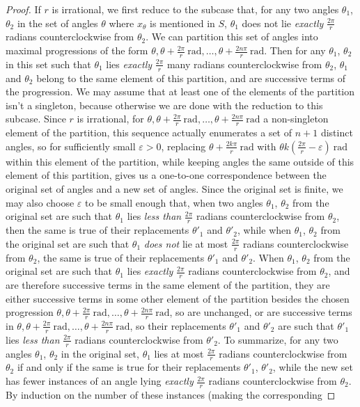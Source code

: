 \documentclass{amsart}
\theoremstyle{definition}
\theoremstyle{remark}
\numberwithin{equation}{section}
\begin{document}
\begin{proof}
    If $r$ is irrational, we first reduce to the subcase that, for any two angles $\theta_{1}$, $\theta_{2}$ in the set of angles $\theta$ where $x_{\theta}$ is mentioned in $S$, $\theta_{1}$ does not lie \textit{exactly} $\frac{2\pi}{r}$ radians counterclockwise from $\theta_{2}$. We can partition this set of angles into maximal progressions of the form $\theta, \theta + \frac{2\pi}{r} \mathrm{\: rad}, \ldots, \theta + \frac{2n\pi}{r} \mathrm{\: rad} $. Then for any $\theta_{1}$, $\theta_{2}$ in this set such that $\theta_{1}$ lies \textit{exactly} $\frac{2\pi}{r}$ many radians counterclockwise from $\theta_{2}$, $\theta_{1}$ and $\theta_{2}$ belong to the same element of this partition, and are successive terms of the progression. We may assume that at least one of the elements of the partition isn't a singleton, because otherwise we are done with the reduction to this subcase. Since $r$ is irrational, for $\theta, \theta + \frac{2\pi}{r} \mathrm{\: rad}, \ldots, \theta + \frac{2n\pi}{r} \mathrm{\: rad} $ a non-singleton element of the partition, this sequence actually enumerates a set of $n+1$ distinct angles, so for sufficiently small $ \varepsilon > 0$, replacing $\theta + \frac{2k\pi}{r} \mathrm{\: rad}  $ with $\theta  k(\frac{2\pi}{r} - \varepsilon) \mathrm{\: rad}$ within this element of the partition, while keeping angles the same outside of this element of this partition, gives us a one-to-one correspondence between the original set of angles and a new set of angles. Since the original set is finite, we may also choose $\varepsilon$ to be small enough that, when two angles $\theta_{1}$, $\theta_{2}$ from the original set are such that $\theta_{1}$ lies \textit{less than} $\frac{2\pi}{r}$ radians counterclockwise from $\theta_{2}$, then the same is true of their replacements $\theta'_{1}$ and $\theta'_{2}$, while when $\theta_{1}$, $\theta_{2}$ from the original set are such that $\theta_{1}$ \textit{does not} lie at most $\frac{2\pi}{r}$ radians counterclockwise from $\theta_{2}$, the same is true of their replacements $\theta'_{1}$ and $\theta'_{2}$. When $\theta_{1}$, $\theta_{2}$ from the original set are such that $\theta_{1}$ lies \textit{exactly} $\frac{2\pi}{r}$ radians counterclockwise from $\theta_{2}$, and are therefore successive terms in the same element of the partition, they are either successive terms in some other element of the partition besides the chosen progression $\theta, \theta + \frac{2\pi}{r} \mathrm{\: rad}, \ldots, \theta + \frac{2n\pi}{r} \mathrm{\: rad} $, so are unchanged, or are successive terms in $\theta, \theta + \frac{2\pi}{r} \mathrm{\: rad}, \ldots, \theta + \frac{2n\pi}{r} \mathrm{\: rad} $, so their replacements $\theta'_{1}$ and $\theta'_{2}$ are such that $\theta'_{1}$ lies \textit{less than} $\frac{2\pi}{r}$ radians counterclockwise from $\theta'_{2}$. To summarize, for any two angles $\theta_{1}$, $\theta_{2}$ in the original set, $\theta_{1}$ lies at most $\frac{2\pi}{r}$ radians counterclockwise from $\theta_{2}$ if and only if the same is true for their replacements $\theta'_{1}$, $\theta'_{2}$, while the new set has fewer instances of an angle lying \textit{exactly} $\frac{2\pi}{r}$ radians counterclockwise from $\theta_{2}$. By induction on the number of these instances (making the corresponding 
\end{proof}
\end{document}
